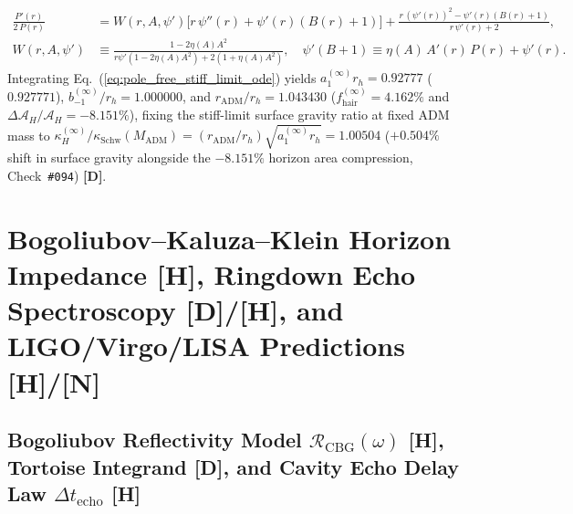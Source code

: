 \documentclass[11pt,a4paper]{article}
\newcommand{\catD}{\textbf{\textcolor{blue!75!black}{[D]}}}
\newcommand{\catH}{\textbf{\textcolor{orange!85!black}{[H]}}}
\newcommand{\catN}{\textbf{\textcolor{teal!75!black}{[N]}}}
\theoremstyle{plain}
\theoremstyle{definition}
\theoremstyle{remark}
\numberwithin{equation}{section}
\begin{document}
\begin{enumerate}
    \begin{align}
      \frac{P'(r)}{2\,P(r)} &= W(r, A, \psi')\Big[r\,\psi''(r) + \psi'(r)\left(B(r) + 1\right)\Big] + \frac{r\,(\psi'(r))^2 - \psi'(r)\left(B(r) + 1\right)}{r\,\psi'(r) + 2}, \nonumber \\[3pt]
      W(r, A, \psi') &\equiv \frac{1 - 2\eta(A)A^2}{r\psi'(1 - 2\eta(A)A^2) + 2(1 + \eta(A)A^2)}, \quad \psi'(B + 1) \equiv \eta(A)\,A'(r)\,P(r) + \psi'(r).
      \label{eq:pole_free_stiff_limit_ode}
    \end{align}
    Integrating Eq.~(\ref{eq:pole_free_stiff_limit_ode}) yields $a_1^{(\infty)} r_h = 0.92777$ ($0.927771$), $b_{-1}^{(\infty)}/r_h = 1.000000$, and $r_{\text{ADM}}/r_h = 1.043430$ ($f_{\text{hair}}^{(\infty)} = \mathbf{4.162\%}$ and $\Delta\mathcal{A}_H/\mathcal{A}_H = \mathbf{-8.151\%}$), fixing the stiff-limit surface gravity ratio at fixed ADM mass to $\kappa_H^{(\infty)}/\kappa_{\text{Schw}}(M_{\text{ADM}}) = (r_{\text{ADM}}/r_h)\sqrt{a_1^{(\infty)} r_h} = \mathbf{1.00504}$ ($+0.504\%$ shift in surface gravity alongside the $-8.151\%$ horizon area compression, Check~\texttt{\#094}) \catD.
\end{enumerate}

\section{\texorpdfstring{Bogoliubov--Kaluza--Klein Horizon Impedance \catH, Ringdown Echo Spectroscopy \catD/\catH, and LIGO/Virgo/LISA Predictions \catH/\catN}{Bogoliubov-Kaluza-Klein Horizon Impedance, Ringdown Echo Spectroscopy, and LIGO/Virgo/LISA Predictions}}

\subsection{\texorpdfstring{Bogoliubov Reflectivity Model $\mathcal{R}_{\text{CBG}}(\omega)$ \catH, Tortoise Integrand \catD, and Cavity Echo Delay Law $\Delta t_{\text{echo}}$ \catH}{Bogoliubov Reflectivity Model, Tortoise Integrand, and Cavity Echo Delay Law}}
\end{document}
